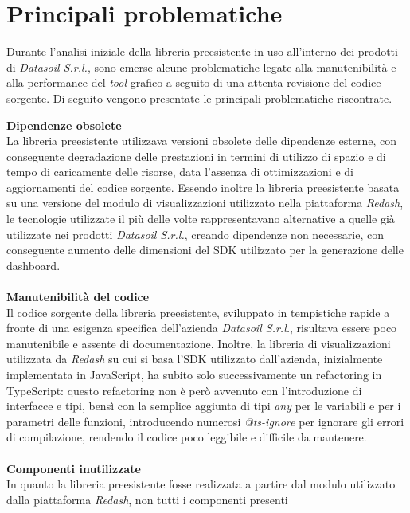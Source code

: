 \section{Principali problematiche}
Durante l'analisi iniziale della libreria preesistente in uso all'interno dei prodotti di \textit{Datasoil S.r.l.}, sono emerse alcune problematiche
legate alla manutenibilità e alla performance del \textit{tool} grafico a seguito di una attenta revisione del codice sorgente. \newline
Di seguito vengono presentate le principali problematiche riscontrate.

\textbf{Dipendenze obsolete}\\
La libreria preesistente utilizzava versioni obsolete delle dipendenze esterne, con conseguente degradazione delle prestazioni in termini
di utilizzo di spazio e di tempo di caricamente delle risorse, data l'assenza di ottimizzazioni e di aggiornamenti del codice sorgente. \newline
Essendo inoltre la libreria preesistente basata su una versione del modulo di visualizzazioni utilizzato nella piattaforma \textit{Redash},
le tecnologie utilizzate il più delle volte rappresentavano alternative a quelle già utilizzate nei prodotti \textit{Datasoil S.r.l.}, creando dipendenze
non necessarie, con conseguente aumento delle dimensioni del SDK utilizzato per la generazione delle dashboard.\\
\\
\textbf{Manutenibilità del codice}\\
Il codice sorgente della libreria preesistente, sviluppato in tempistiche rapide a fronte di una esigenza specifica dell'azienda \textit{Datasoil S.r.l.},
risultava essere poco manutenibile e assente di documentazione. \newline
Inoltre, la libreria di visualizzazioni utilizzata da \textit{Redash} su cui si basa l'SDK utilizzato dall'azienda, inizialmente implementata in JavaScript,
ha subito solo successivamente un refactoring in TypeScript: questo refactoring non è però avvenuto con l'introduzione di interfacce e tipi, bensì con la semplice aggiunta
di tipi \textit{any} per le variabili e per i parametri delle funzioni, introducendo numerosi \textit{@ts-ignore} per ignorare gli errori di compilazione, rendendo il codice
poco leggibile e difficile da mantenere.\\
\\
\textbf{Componenti inutilizzate}\\
In quanto la libreria preesistente fosse realizzata a partire dal modulo utilizzato dalla piattaforma \textit{Redash}, non tutti i componenti presenti
